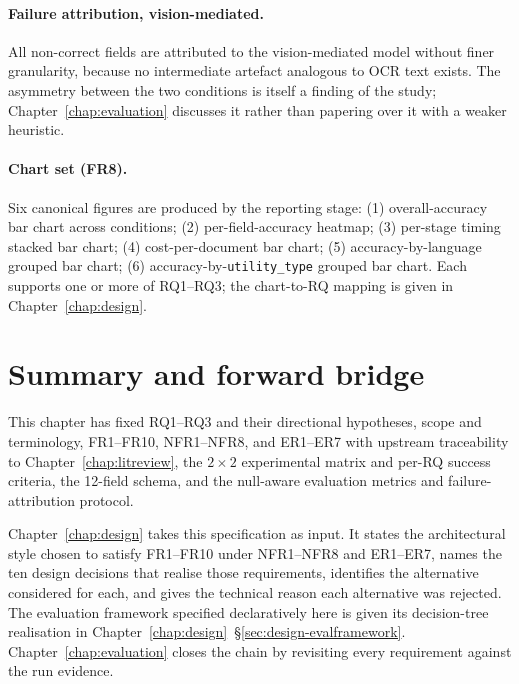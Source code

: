 \paragraph{Failure attribution, vision-mediated.} All non-correct
fields are attributed to the vision-mediated model without finer
granularity, because no intermediate artefact analogous to OCR text
exists. The asymmetry between the two conditions is itself a finding
of the study; Chapter~\ref{chap:evaluation} discusses it rather than
papering over it with a weaker heuristic.

\paragraph{Chart set (FR8).} Six canonical figures are produced by
the reporting stage: (1) overall-accuracy bar chart across
conditions; (2) per-field-accuracy heatmap; (3) per-stage timing
stacked bar chart; (4) cost-per-document bar chart;
(5) accuracy-by-language grouped bar chart; (6)
accuracy-by-\texttt{utility\_type} grouped bar chart. Each supports
one or more of RQ1--RQ3; the chart-to-RQ mapping is given in
Chapter~\ref{chap:design}.

\section{Summary and forward bridge}
\label{sec:spec-bridge}

This chapter has fixed RQ1--RQ3 and their directional hypotheses,
scope and terminology, FR1--FR10, NFR1--NFR8, and ER1--ER7 with
upstream traceability to Chapter~\ref{chap:litreview}, the $2\times 2$
experimental matrix and per-RQ success criteria, the 12-field
schema, and the null-aware evaluation metrics and failure-attribution
protocol.

Chapter~\ref{chap:design} takes this specification as input. It
states the architectural style chosen to satisfy FR1--FR10 under
NFR1--NFR8 and ER1--ER7, names the ten design decisions that
realise those requirements, identifies the alternative considered
for each, and gives the technical reason each alternative was
rejected. The evaluation framework specified declaratively here is
given its decision-tree realisation in
Chapter~\ref{chap:design}~\S\ref{sec:design-evalframework}.
Chapter~\ref{chap:evaluation} closes the chain by revisiting every
requirement against the run evidence.
